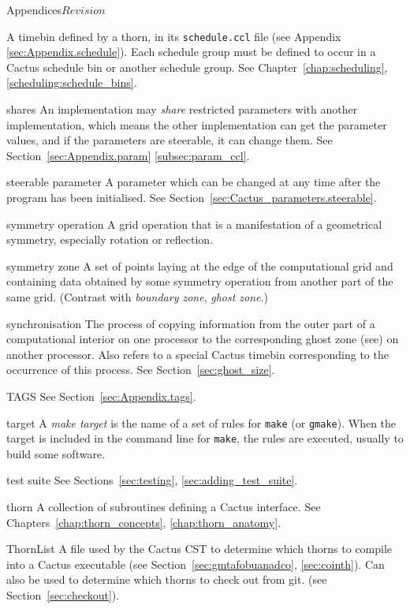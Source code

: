 \begin{cactuspart}{Appendices}{}{$Revision$}
\begin{Lentry}
  A timebin defined by a thorn, in its {\tt schedule.ccl} file (see
  Appendix \ref{sec:Appendix.schedule}).
  Each schedule group must be defined to occur in a Cactus schedule bin or
  another schedule group.  
  See Chapter~\ref{chap:scheduling}, \ref{scheduling:schedule_bins}.
\item[shares] An implementation may \textit{share} restricted parameters
  with another implementation, which means the other implementation can
  get the parameter values, and if the parameters are steerable, it can
  change them.
  See Section~\ref{sec:Appendix.param} \ref{subsec:param_ccl}.
\item[steerable parameter]
  A parameter which can be changed at any time after the program has been
  initialised.  See Section~\ref{sec:Cactus_parameters.steerable}.
\item[symmetry operation]
  A grid operation that is a manifestation of a geometrical symmetry,
  especially rotation or reflection.
\item[symmetry zone]
  A set of points laying at the edge of the computational grid and
  containing data obtained by some symmetry operation from
  another part of the same grid.
  (Contrast with \textit{boundary zone}, \textit{ghost zone}.)
\item[synchronisation]
  The process of copying information from the outer part of a 
  computational interior on one processor to the corresponding ghost zone 
  (see) on another processor.  Also refers to a special Cactus timebin
  corresponding to the occurrence of this process. 
  See Section~\ref{sec:ghost_size}.
\item[TAGS]
  See Section~\ref{sec:Appendix.tags}.
\item[target]
  A \textit{make target} is the name of a set of rules for 
  \texttt{make} (or \texttt{gmake}).  When the target is included in the
  command line for \texttt{make}, the rules are executed, usually to
  build some software.
\item[test suite]
  See Sections~\ref{sec:testing}, \ref{sec:adding_test_suite}.
\item[thorn]
  A collection of subroutines defining a Cactus interface.  
  See Chapters~\ref{chap:thorn_concepts}, \ref{chap:thorn_anatomy}.
\item[ThornList]
  A file used by the Cactus CST to determine which thorns to compile 
  into a Cactus executable
  (see Section~\ref{sec:gmtafobuanadco}, \ref{sec:cointh}). 
  Can also be used to determine which thorns
  to check out from git. (see Section~\ref{sec:checkout}).

\end{Lentry}
\end{cactuspart}
